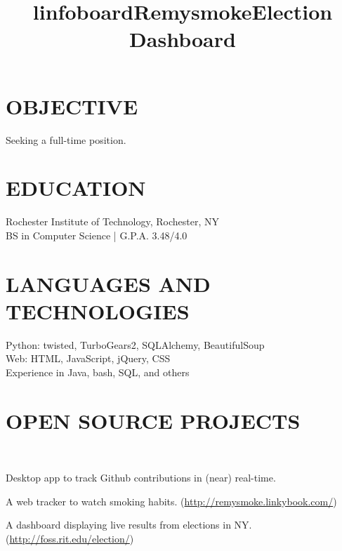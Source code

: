 \documentclass[line]{res}
\begin{document}

\begin{resume}

\section{OBJECTIVE}
    Seeking a full-time position.

\section{EDUCATION}
    Rochester Institute of Technology, Rochester, NY \\
    BS in Computer Science | G.P.A. 3.48/4.0

\section{LANGUAGES AND TECHNOLOGIES}
    Python: twisted, TurboGears2, SQLAlchemy, BeautifulSoup\\
    Web: HTML, JavaScript, jQuery, CSS\\
    Experience in Java, bash, SQL, and others

\section{OPEN SOURCE PROJECTS}
    \begin{format}
        \title{l}\\
        \body
    \end{format}

    \title{infoboard}
    \begin{position}
        Desktop app to track Github contributions in (near) real-time.
    \end{position}

    \title{Remysmoke}
    \begin{position}
        A web tracker to watch smoking habits.
        (\url{http://remysmoke.linkybook.com/})
    \end{position}

    \title{Election Dashboard}
    \begin{position}
        A dashboard displaying live results from elections in NY.
        (\url{http://foss.rit.edu/election/})
    \end{position}


\end{resume}
\end{document}
